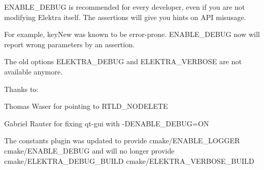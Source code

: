 {\ttfamily E\+N\+A\+B\+L\+E\+\_\+\+D\+E\+B\+UG} is recommended for every developer, even if you are not modifying Elektra itself. The assertions will give you hints on A\+PI misusage.

For example, {\ttfamily key\+New} was known to be error-\/prone. {\ttfamily E\+N\+A\+B\+L\+E\+\_\+\+D\+E\+B\+UG} now will report wrong parameters by an assertion.

The old options {\ttfamily E\+L\+E\+K\+T\+R\+A\+\_\+\+D\+E\+B\+UG} and {\ttfamily E\+L\+E\+K\+T\+R\+A\+\_\+\+V\+E\+R\+B\+O\+SE} are not available anymore.

Thanks to\+:


\begin{DoxyItemize}
\item Thomas Waser for pointing to {\ttfamily R\+T\+L\+D\+\_\+\+N\+O\+D\+E\+L\+E\+TE}
\item Gabriel Rauter for fixing qt-\/gui with {\ttfamily -\/D\+E\+N\+A\+B\+L\+E\+\_\+\+D\+E\+B\+UG=ON}
\end{DoxyItemize}

The constants plugin was updated to provide {\ttfamily cmake/\+E\+N\+A\+B\+L\+E\+\_\+\+L\+O\+G\+G\+ER} {\ttfamily cmake/\+E\+N\+A\+B\+L\+E\+\_\+\+D\+E\+B\+UG} and will no longer provide {\ttfamily cmake/\+E\+L\+E\+K\+T\+R\+A\+\_\+\+D\+E\+B\+U\+G\+\_\+\+B\+U\+I\+LD} {\ttfamily cmake/\+E\+L\+E\+K\+T\+R\+A\+\_\+\+V\+E\+R\+B\+O\+S\+E\+\_\+\+B\+U\+I\+LD}


